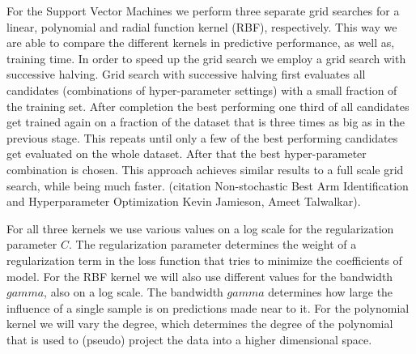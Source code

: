 For the Support Vector Machines we perform three separate grid searches for a linear, polynomial and radial function kernel (RBF), respectively.
This way we are able to compare the different kernels in predictive performance, as well as, training time.
In order to speed up the grid search we employ a grid search with successive halving. 
Grid search with successive halving first evaluates all candidates (combinations of hyper-parameter settings) with a small fraction of the training set.
After completion the best performing one third of all candidates get trained again on a fraction of the dataset that is three times as big as in the previous stage.
This repeats until only a few of the  best performing candidates get evaluated on the whole dataset.
After that the best hyper-parameter combination is chosen.
This approach achieves similar results to a full scale grid search, while being much faster. (citation Non-stochastic Best Arm Identification and Hyperparameter Optimization
Kevin Jamieson, Ameet Talwalkar).

For all three kernels we use various values on a log scale for the regularization parameter \(C\).
The regularization parameter determines the weight of a regularization term in the loss function that tries to minimize the coefficients of model.
For the RBF kernel we will also use different values for the bandwidth \(gamma\), also on a log scale.
The bandwidth \(gamma\) determines how large the influence of a single sample is on predictions made near to it.
For the polynomial kernel we will vary the degree, which determines the degree of the polynomial that is used to (pseudo) project the data into a higher dimensional space.  











